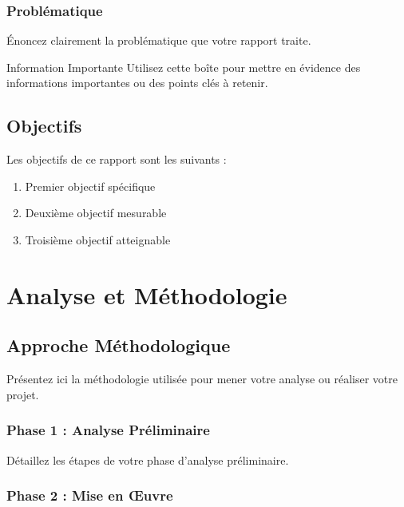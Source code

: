 \documentclass{modern-report}
\begin{document}
\subsection{Problématique}

Énoncez clairement la problématique que votre rapport traite.

\begin{infobox}{Information Importante}
Utilisez cette boîte pour mettre en évidence des informations importantes ou des points clés à retenir.
\end{infobox}

\section{Objectifs}

Les objectifs de ce rapport sont les suivants :

\begin{enumerate}
    \item Premier objectif spécifique
    \item Deuxième objectif mesurable
    \item Troisième objectif atteignable
\end{enumerate}

\modernseparator

\chapter{Analyse et Méthodologie}

\section{Approche Méthodologique}

Présentez ici la méthodologie utilisée pour mener votre analyse ou réaliser votre projet.

\subsection{Phase 1 : Analyse Préliminaire}

Détaillez les étapes de votre phase d'analyse préliminaire.

\subsection{Phase 2 : Mise en Œuvre}
\end{document}
